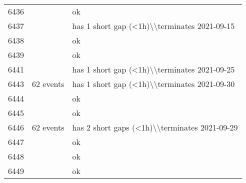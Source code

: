 \begin{longtable}{p{1cm}p{7cm}p{7cm}}
6436 &                                                                                 &                                                                                              ok \\
6437 &                                                                                 &                                                    has 1 short gap (<1h)\textbackslash \textbackslash terminates 2021-09-15 \\
6438 &                                                                                 &                                                                                              ok \\
6439 &                                                                                 &                                                                                              ok \\
6441 &                                                                                 &                                                    has 1 short gap (<1h)\textbackslash \textbackslash terminates 2021-09-25 \\
6443 &                                                                       62 events &                                                    has 1 short gap (<1h)\textbackslash \textbackslash terminates 2021-09-30 \\
6444 &                                                                                 &                                                                                              ok \\
6445 &                                                                                 &                                                                                              ok \\
6446 &                                                                       62 events &                                                   has 2 short gaps (<1h)\textbackslash \textbackslash terminates 2021-09-29 \\
6447 &                                                                                 &                                                                                              ok \\
6448 &                                                                                 &                                                                                              ok \\
6449 &                                                                                 &                                                                                              ok \\
\end{longtable}
